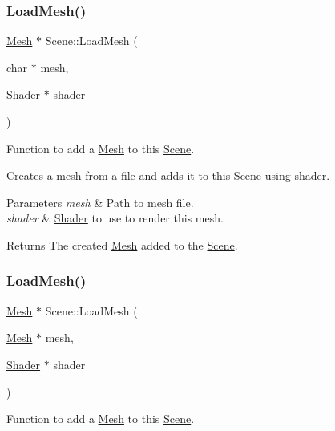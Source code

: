 \subsubsection{\texorpdfstring{Load\+Mesh()}{LoadMesh()}\hspace{0.1cm}{\footnotesize\ttfamily [1/2]}}
{\footnotesize\ttfamily \hyperlink{class_mesh}{Mesh} $\ast$ Scene\+::\+Load\+Mesh (\begin{DoxyParamCaption}\item[{char $\ast$}]{mesh,  }\item[{\hyperlink{class_shader}{Shader} $\ast$}]{shader }\end{DoxyParamCaption})}



Function to add a \hyperlink{class_mesh}{Mesh} to this \hyperlink{class_scene}{Scene}. 

Creates a mesh from a file and adds it to this \hyperlink{class_scene}{Scene} using shader.


\begin{DoxyParams}{Parameters}
{\em mesh} & Path to mesh file. \\
\hline
{\em shader} & \hyperlink{class_shader}{Shader} to use to render this mesh. \\
\hline
\end{DoxyParams}
\begin{DoxyReturn}{Returns}
The created \hyperlink{class_mesh}{Mesh} added to the \hyperlink{class_scene}{Scene}. 
\end{DoxyReturn}
\mbox{\label{class_scene_a676cf764adad1d7e30311582ccae2b7e}} 
\subsubsection{\texorpdfstring{Load\+Mesh()}{LoadMesh()}\hspace{0.1cm}{\footnotesize\ttfamily [2/2]}}
{\footnotesize\ttfamily \hyperlink{class_mesh}{Mesh} $\ast$ Scene\+::\+Load\+Mesh (\begin{DoxyParamCaption}\item[{\hyperlink{class_mesh}{Mesh} $\ast$}]{mesh,  }\item[{\hyperlink{class_shader}{Shader} $\ast$}]{shader }\end{DoxyParamCaption})}



Function to add a \hyperlink{class_mesh}{Mesh} to this \hyperlink{class_scene}{Scene}. 

